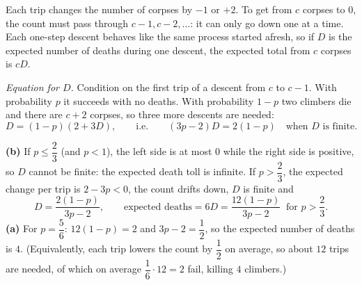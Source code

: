 Each trip changes the number of corpses by $-1$ or $+2$. To get from $c$ corpses to $0$, the count must pass through $c-1,c-2,\dots$: it can only go down one at a time. Each one-step descent behaves like the same process started afresh, so if $D$ is the expected number of deaths during one descent, the expected total from $c$ corpses is $cD$.

\emph{Equation for $D$.} Condition on the first trip of a descent from $c$ to $c-1$. With probability $p$ it succeeds with no deaths. With probability $1-p$ two climbers die and there are $c+2$ corpses, so three more descents are needed:
\[D=(1-p)(2+3D),\qquad\text{i.e.}\qquad(3p-2)D=2(1-p)\quad\text{when $D$ is finite.}\]

\textbf{(b)} If $p\le\dfrac23$ (and $p<1$), the left side is at most $0$ while the right side is positive, so $D$ cannot be finite: the expected death toll is infinite. If $p>\dfrac23$, the expected change per trip is $2-3p<0$, the count drifts down, $D$ is finite and
\[D=\dfrac{2(1-p)}{3p-2},\qquad\text{expected deaths}=6D=\boxed{\dfrac{12(1-p)}{3p-2}\ \text{ for }p>\dfrac23}.\]
\textbf{(a)} For $p=\dfrac56$: $12(1-p)=2$ and $3p-2=\dfrac12$, so the expected number of deaths is $\boxed{4}$. (Equivalently, each trip lowers the count by $\dfrac12$ on average, so about $12$ trips are needed, of which on average $\dfrac16\cdot12=2$ fail, killing $4$ climbers.)
